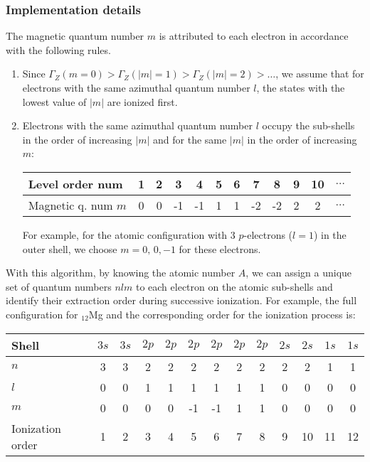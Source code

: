 \documentclass[prd, preprint,
aps,
amsmath,
amssymb,
onecolumn,
nofootinbib,
superscriptaddress,
]{revtex4-2}
\begin{document}
	\subsubsection{Implementation details}
	The magnetic quantum number $m$ is attributed to each electron in accordance with the following rules. 
	\begin{enumerate}
		\item Since $\Gamma_Z(m=0)>\Gamma_Z(|m|=1)>\Gamma_Z(|m|=2)>\ldots$, we assume that for electrons with the same azimuthal quantum number $l$, the states with the lowest value of $|m|$ are ionized first.
		
		\clearpage
		\item Electrons with the same azimuthal quantum number $l$ occupy the sub-shells in the order of increasing $|m|$ and for the same $|m|$ in the order of increasing $m$:
		\begin{table}[!h]
			\begin{tabular}{l | c | c | c | c | c | c | c | c | c | c | c}
				Level order num & 1 & 2 &  3 &  4 & 5 & 6 &  7 &  8 & 9 & 10 & $\ldots$ \\ \hline
				Magnetic q. num $m$ & 0 & 0 & -1 & -1 & 1 & 1 & -2 & -2 & 2 & 2 & $\ldots$
			\end{tabular}
		\end{table}
		
		For example, for the atomic configuration with 3 $p$-electrons ($l=1$) in the outer shell,  we choose $m=0,\, 0, -1$ for these electrons. 
		
		
	\end{enumerate}
	With this algorithm, by knowing the atomic number $A$, we can assign a unique set of quantum numbers $nlm$ to each electron on the atomic sub-shells and identify their extraction order during successive ionization. 
	For example, the full configuration for ${}_{12}$Mg and the corresponding order for the ionization process is:
	\begin{table}[h!]
		\begin{tabular}{l | c | c | c | c | c | c | c | c | c | c | c | c}
			Shell & $3s$ & $3s$ & $2p$ & $2p$ & $2p$ & $2p$ & $2p$ & $2p$ & $2s$ & $2s$ & $1s$ & $1s$ \\\hline
			$n$   &    3 &    3 &    2 &    2 &    2 &    2 &    2 &    2 &    2 &    2 &    1 &    1 \\\hline
			$l$   &    0 &    0 &    1 &    1 &    1 &    1 &    1 &    1 &    0 &    0 &    0 &    0 \\\hline
			$m$   &    0 &    0 &    0 &    0 &   -1 &   -1 &    1 &    1 &    0 &    0 &    0 &    0 \\\hline
			Ionization order & 1 & 2 &  3 &  4 & 5 & 6 &  7 &  8 & 9 & 10 & 11 & 12
		\end{tabular}
	\end{table}		
\end{document}
